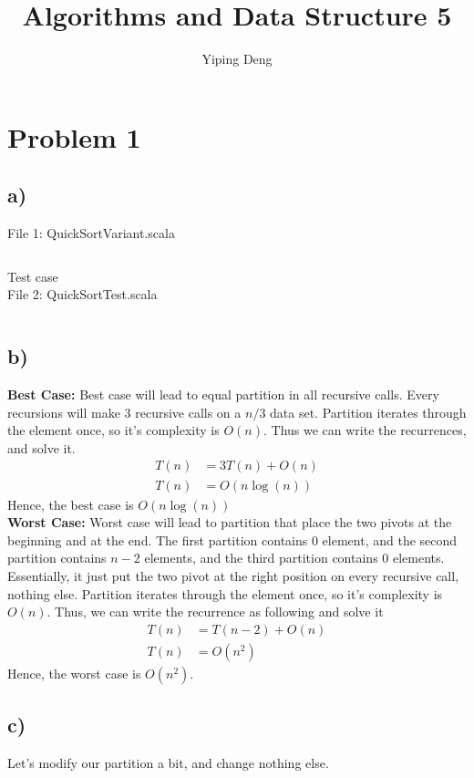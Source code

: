 \documentclass{article}
\newcommand{\hwnumber}{5}
\begin{document}
\title{Algorithms and Data Structure \hwnumber}
\author{Yiping Deng}
\maketitle
\thispagestyle{fancy}
\section*{Problem 1}
\subsection*{a)}
File 1: QuickSortVariant.scala
\inputminted{Scala}{QuickSort/src/main/scala/QuickSortVariant.scala}
Test case \\
File 2: QuickSortTest.scala
\inputminted{Scala}{QuickSort/src/test/scala/QuickSortTest.scala}
\subsection*{b)}
\textbf{Best Case:}
Best case will lead to equal partition in all recursive calls.
Every recursions will make 3 recursive calls on a $n/3$ data
set.
Partition iterates through the element once,
so it's complexity is $O(n)$.
Thus we can write the recurrences, and solve it. \\
\begin{align*}
    T(n) &= 3 T(n) + O(n) \\
    T(n) &= O(n \log(n))
\end{align*}
Hence, the best case is $O(n \log(n))$ \\
\textbf{Worst Case:}
Worst case will lead to partition that place the two
pivots at the beginning and at the end.
The first partition contains $0$ element, and the second
partition contains $n - 2$ elements, and the third
partition contains $0$ elements.
Essentially, it just put the two pivot at the right position
on every recursive call, nothing else.
Partition iterates through the element once,
so it's complexity is $O(n)$.
Thus, we can write the recurrence as following and solve it
\begin{align*}
    T(n) &= T(n - 2) + O(n) \\
    T(n) &= O(n^2)
\end{align*}
Hence, the worst case is $O(n^2)$.
\subsection*{c)}
Let's modify our partition a bit, and change nothing else.
\end{document}

